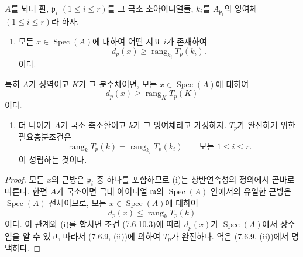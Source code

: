 \begin{corollary}[7.6.10]
\label{III.7.6.10-fr}
$A$를 뇌터 환, $\mathfrak p_i$ $(1\leq i\leq r)$를 그 극소 소아이디얼들,
$k_i$를 $A_{\mathfrak p_i}$의 잉여체 $(1\leq i\leq r)$라 하자.
\begin{enumerate}
  \item[(i)] 모든 $x\in\operatorname{Spec}(A)$에 대하여 어떤 지표 $i$가
    존재하여
    \[
      d_p(x)\geq\operatorname{rang}_{k_i}T_p(k_i).
      \tag{7.6.10.1}\label{III.7.6.10.1.fr}
    \]
    이다.
\end{enumerate}
특히 $A$가 정역이고 $K$가 그 분수체이면, 모든
$x\in\operatorname{Spec}(A)$에 대하여
\[
  d_p(x)\geq\operatorname{rang}_K T_p(K)
  \tag{7.6.10.2}\label{III.7.6.10.2.fr}
\]
이다.
\begin{enumerate}
  \item[(ii)] 더 나아가 $A$가 국소 축소환이고 $k$가 그 잉여체라고
    가정하자. $T_p$가 완전하기 위한 필요충분조건은
    \[
      \operatorname{rang}_k T_p(k)
      =
      \operatorname{rang}_{k_i}T_p(k_i)
      \qquad\text{모든 }1\leq i\leq r.
      \tag{7.6.10.3}\label{III.7.6.10.3.fr}
    \]
    이 성립하는 것이다.
\end{enumerate}
\end{corollary}

\begin{proof}
모든 $x$의 근방은 $\mathfrak p_i$ 중 하나를 포함하므로 (i)는
상반연속성의 정의에서 곧바로 따른다. 한편 $A$가 국소이면 극대
아이디얼 $\mathfrak m$의 $\operatorname{Spec}(A)$ 안에서의 유일한 근방은
$\operatorname{Spec}(A)$ 전체이므로, 모든
$x\in\operatorname{Spec}(A)$에 대하여
\[
  d_p(x)\leq\operatorname{rang}_k T_p(k)
\]
이다. 이 관계와 (i)를 합치면 조건 (7.6.10.3)에 따라 $d_p(x)$가
$\operatorname{Spec}(A)$에서 상수임을 알 수 있고, 따라서
(7.6.9, (ii))에 의하여 $T_p$가 완전하다. 역은 (7.6.9, (ii))에서
명백하다.
\end{proof}

